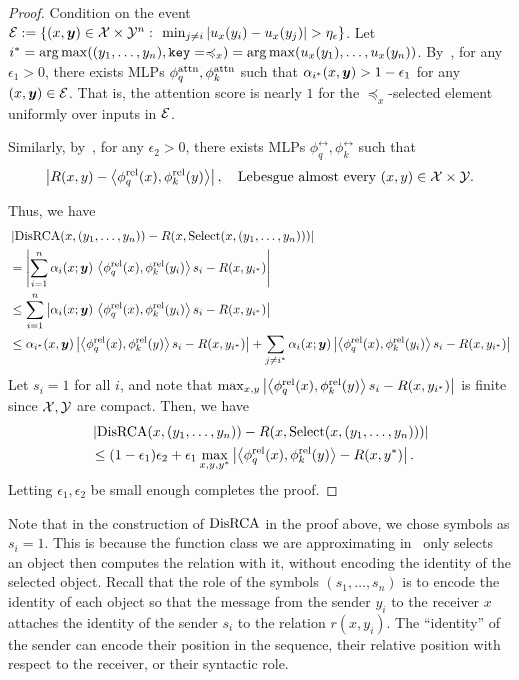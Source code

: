 \documentclass{article}
\begin{document}
\begin{proof}
  Condition on the event ${\mathcal{E}} := \{(x, \bm{y}) \in {\mathcal{X}} \times {\mathcal{Y}}^n \,\colon\, \min_{j \neq i} \left\lvert u_x(y_i) - u_x(y_j)\right\rvert > \eta_\epsilon\}$. Let $i^* = \operatorname*{arg\,max}((y_1, \ldots, y_n), \mathtt{key} = \preccurlyeq_x) = \operatorname*{arg\,max}(u_x(y_1), \ldots, u_x(y_n))$. By~\citep[Theorem 5.1]{altabaa2024approximation}, for any $\epsilon_1 > 0$, there exists MLPs $\phi_q^{\mathrm{attn}}, \phi_k^{\mathrm{attn}}$ such that $\alpha_{i^*}(x, \bm{y}) > 1 - \epsilon_1$ for any $(x, \bm{y}) \in {\mathcal{E}}$. That is, the attention score is nearly $1$ for the $\preceq_x$-selected element uniformly over inputs in ${\mathcal{E}}$.

  Similarly, by~\citep[Theorem 3.1]{altabaa2024approximation}, for any $\epsilon_2 > 0$, there exists MLPs $\phi_q^{\rel}, \phi_k^{\rel}$ such that
  \begin{equation*}
    \left\lvert R(x, y) - \left \langle \phi_q^{\mathrm{rel}}(x), \phi_k^{\mathrm{rel}}(y) \right\rangle\right\rvert, \quad \text{Lebesgue almost every } (x, y) \in {\mathcal{X}} \times {\mathcal{Y}}.
  \end{equation*}

  Thus, we have
  \begin{align*}
    &\left\lvert\mathrm{DisRCA}(x, (y_1, \ldots, y_n)) - R(x, \mathrm{Select}(x, (y_1, \ldots, y_n)))\right\rvert \\
    &= \left\lvert\sum_{i=1}^{n} \alpha_i(x; \bm{y}) \,\left \langle \phi_q^{\mathrm{rel}}(x), \phi_k^{\mathrm{rel}}(y_i) \right\rangle s_i - R(x, y_{i^*})\right\rvert \\
    &\leq \sum_{i=1}^{n} \left\lvert\alpha_i(x; \bm{y}) \,\left \langle \phi_q^{\mathrm{rel}}(x), \phi_k^{\mathrm{rel}}(y_i) \right\rangle s_i - R(x, y_{i^*})\right\rvert \\
    &\leq \alpha_{i^*}(x, \bm{y}) \left\lvert\left \langle \phi_q^{\mathrm{rel}}(x), \phi_k^{\mathrm{rel}}(y) \right\rangle s_i - R(x, y_{i^*})\right\rvert + \sum_{j \neq i^*} \alpha_i(x; \bm{y}) \left\lvert\left \langle \phi_q^{\mathrm{rel}}(x), \phi_k^{\mathrm{rel}}(y_i) \right\rangle s_i - R(x, y_{i^*})\right\rvert
  \end{align*}
  Let $s_i = 1$ for all $i$, and note that $\max_{x, y} \left\lvert\left \langle \phi_q^{\mathrm{rel}}(x), \phi_k^{\mathrm{rel}}(y) \right\rangle s_i - R(x, y_{i^*})\right\rvert$ is finite since ${\mathcal{X}}, {\mathcal{Y}}$ are compact. Then, we have
  \begin{align*}
    &\left\lvert\mathrm{DisRCA}(x, (y_1, \ldots, y_n)) - R(x, \mathrm{Select}(x, (y_1, \ldots, y_n)))\right\rvert \\
    &\leq (1 - \epsilon_1) \epsilon_2 + \epsilon_1 \max_{x, y, y^*} \left\lvert\left \langle \phi_q^{\mathrm{rel}}(x), \phi_k^{\mathrm{rel}}(y) \right\rangle - R(x, y^{*})\right\rvert.
  \end{align*}
  Letting $\epsilon_1, \epsilon_2$ be small enough completes the proof.
\end{proof}

\begin{remark}
  Note that in the construction of $\mathrm{DisRCA}$ in the proof above, we chose symbols as $s_i = 1$. This is because the function class we are approximating in~ only selects an object then computes the relation with it, without encoding the identity of the selected object. Recall that the role of the symbols $(s_1, \ldots, s_n)$ is to encode the identity of each object so that the message from the sender $y_i$ to the receiver $x$ attaches the identity of the sender $s_i$ to the relation $r(x, y_i)$. The ``identity'' of the sender can encode their position in the sequence, their relative position with respect to the receiver, or their syntactic role.
\end{remark}
\end{document}
